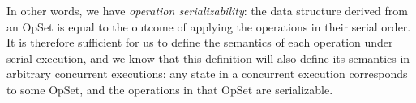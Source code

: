 In other words, we have \emph{operation serializability}: the data structure derived from an OpSet is equal to the outcome of applying the operations in their serial order.
It is therefore sufficient for us to define the semantics of each operation under serial execution, and we know that this definition will also define its semantics in arbitrary concurrent executions: any state in a concurrent execution corresponds to some OpSet, and the operations in that OpSet are serializable.
